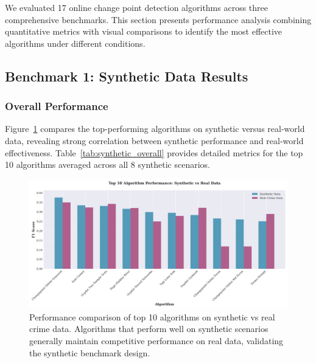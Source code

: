 \documentclass[journal,article,submit,pdftex,moreauthors]{Definitions/mdpi}
\begin{document}
We evaluated 17 online change point detection algorithms across three comprehensive benchmarks. This section presents performance analysis combining quantitative metrics with visual comparisons to identify the most effective algorithms under different conditions.

\subsection{Benchmark 1: Synthetic Data Results}
\label{sec:results_synthetic}

\subsubsection{Overall Performance}

Figure~\ref{fig:top_algorithms} compares the top-performing algorithms on synthetic versus real-world data, revealing strong correlation between synthetic performance and real-world effectiveness. Table~\ref{tab:synthetic_overall} provides detailed metrics for the top 10 algorithms averaged across all 8 synthetic scenarios.

\begin{figure}[ht]
\centering
\includegraphics[width=\textwidth]{figures/fig_top_algorithms_comparison.png}
\caption{Performance comparison of top 10 algorithms on synthetic vs real crime data. Algorithms that perform well on synthetic scenarios generally maintain competitive performance on real data, validating the synthetic benchmark design.}
\label{fig:top_algorithms}
\end{figure}
\end{document}
